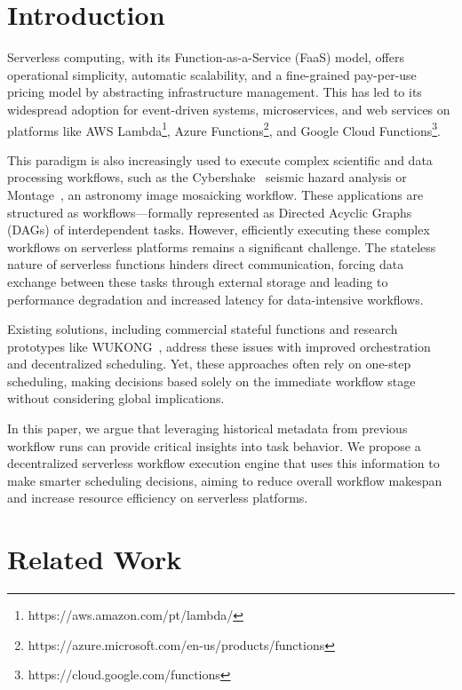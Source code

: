 \documentclass[conference]{IEEEtran}
\begin{document}
\section{Introduction}

Serverless computing, with its Function-as-a-Service (FaaS) model, offers operational simplicity, automatic scalability, and a fine-grained pay-per-use pricing model by abstracting infrastructure management. This has led to its widespread adoption for event-driven systems, microservices, and web services on platforms like AWS Lambda\footnote{https://aws.amazon.com/pt/lambda/}, Azure Functions\footnote{https://azure.microsoft.com/en-us/products/functions}, and Google Cloud Functions\footnote{https://cloud.google.com/functions}.

This paradigm is also increasingly used to execute complex scientific and data processing workflows, such as the Cybershake~\cite{cybershake_workflow} seismic hazard analysis or Montage~\cite{montage_astronomy}, an astronomy image mosaicking workflow. These applications are structured as workflows—formally represented as Directed Acyclic Graphs (DAGs) of interdependent tasks. However, efficiently executing these complex workflows on serverless platforms remains a significant challenge. The stateless nature of serverless functions hinders direct communication, forcing data exchange between these tasks through external storage and leading to performance degradation and increased latency for data-intensive workflows.

Existing solutions, including commercial stateful functions and research prototypes like WUKONG~\cite{wukong_2}, address these issues with improved orchestration and decentralized scheduling. Yet, these approaches often rely on one-step scheduling, making decisions based solely on the immediate workflow stage without considering global implications.

In this paper, we argue that leveraging historical metadata from previous workflow runs can provide critical insights into task behavior. We propose a decentralized serverless workflow execution engine that uses this information to make smarter scheduling decisions, aiming to reduce overall workflow makespan and increase resource efficiency on serverless platforms.


\section{Related Work}
\label{s:related_work}
\end{document}
